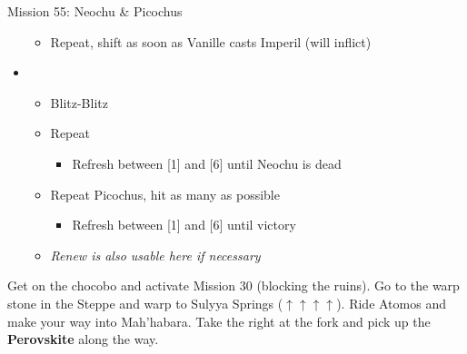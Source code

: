 \begin{battle}{Mission 55: Neochu \& Picochus}
\begin{itemize}
			\begin{itemize}
				\item Repeat, shift as soon as Vanille casts Imperil (will inflict)
			\end{itemize}		
		\item \first
			\begin{itemize}
				\item Blitz-Blitz
				\item Repeat
					\begin{itemize}
						\item Refresh between [1] and [6] until Neochu is dead
					\end{itemize}
				\item Repeat Picochus, hit as many as possible
					\begin{itemize}
						\item Refresh between [1] and [6] until victory
					\end{itemize}
				\item \textit{Renew is also usable here if necessary}
			\end{itemize}		
	\end{itemize}
\end{battle}

Get on the chocobo and activate Mission 30 (blocking the ruins).
Go to the warp stone in the Steppe and warp to Sulyya Springs ($\uparrow\uparrow\uparrow\uparrow$).
Ride Atomos and make your way into Mah'habara.
Take the right at the fork and pick up the \textbf{Perovskite} along the way.

